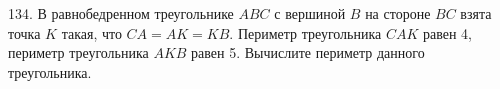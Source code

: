 134. В равнобедренном треугольнике $ABC$ с вершиной $B$ на стороне $BC$ взята точка $K$ такая, что $CA=AK=KB.$ Периметр треугольника $CAK$ равен 4, периметр треугольника $AKB$ равен 5. Вычислите периметр данного треугольника.\\
